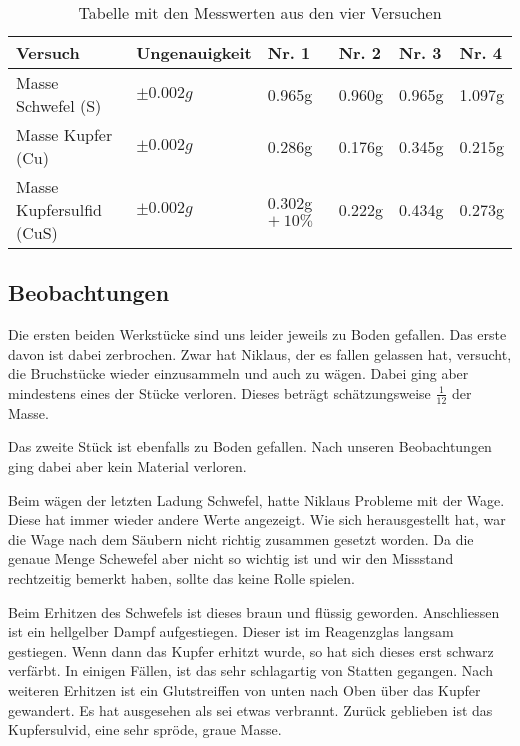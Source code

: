 \documentclass[11pt,paper=a4,final]{scrartcl}
\begin{document}
{
\begin{table}[h!]
\centering
  \begin{tabular}{|l|l|l|l|l|l|}
    \hline
    \bf Versuch			& \bf Ungenauigkeit	& \bf Nr. 1	& \bf Nr. 2	& \bf Nr. 3	& \bf Nr. 4	\\ \hline
    Masse Schwefel (S) 		& \( \pm 0.002g \)	& 0.965g	&	0.960g & 0.965g & 1.097g \\ \hline
    Masse Kupfer (Cu)		& \( \pm 0.002g \)	& 0.286g	&	0.176g & 0.345g & 0.215g \\ \hline
    Masse Kupfersulfid (CuS)	& \( \pm 0.002g \)	& 0.302g \(+ ~ 10\% \)       & 	0.222g & 0.434g & 0.273g \\ \hline
  \end{tabular}
  \caption{Tabelle mit den Messwerten aus den vier Versuchen}
  \label{tab:messwerte}
\end{table}
\subsection{Beobachtungen}
Die ersten beiden Werkst\"ucke sind uns leider jeweils zu Boden gefallen. Das
erste davon ist dabei zerbrochen. Zwar hat Niklaus, der es fallen gelassen hat,
versucht, die Bruchst\"ucke wieder einzusammeln und auch zu w\"agen. Dabei ging
aber mindestens eines der St\"ucke verloren. Dieses betr\"agt sch\"atzungsweise
\( \frac{1}{12} \) der Masse.

Das zweite St\"uck ist ebenfalls zu Boden gefallen. Nach unseren Beobachtungen
ging dabei aber kein Material verloren.

Beim w\"agen der letzten Ladung Schwefel, hatte Niklaus Probleme mit der Wage.
Diese hat immer wieder andere Werte angezeigt. Wie sich herausgestellt hat, war
die Wage nach dem S\"aubern nicht richtig zusammen gesetzt worden. Da die genaue
Menge Schewefel aber nicht so wichtig ist und wir den Missstand rechtzeitig
bemerkt haben, sollte das keine Rolle spielen.

Beim Erhitzen des Schwefels ist dieses braun und fl\"ussig geworden.
Anschliessen ist ein hellgelber Dampf aufgestiegen. Dieser ist im Reagenzglas
langsam gestiegen. Wenn dann das Kupfer erhitzt wurde, so hat sich dieses erst
schwarz verf\"arbt. In einigen F\"allen, ist das sehr schlagartig von Statten
gegangen. Nach weiteren Erhitzen ist ein Glutstreiffen von unten nach
Oben \"uber das Kupfer gewandert. Es hat ausgesehen als sei etwas verbrannt.
Zur\"uck geblieben ist das Kupfersulvid, eine sehr spr\"ode, graue Masse.

}
\end{document}
